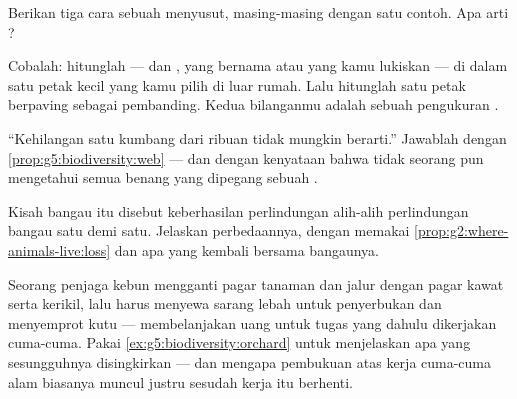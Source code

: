 \begin{exercise}[$\star$]\label{exo:g5:biodiversity:7}
Berikan tiga cara sebuah  menyusut, masing-masing dengan satu
contoh. Apa arti \emph{}?
\end{exercise}

\begin{exercise}[$\star$]\label{exo:g5:biodiversity:8}
Cobalah: hitunglah  ---  dan , yang bernama atau
yang kamu lukiskan --- di dalam satu petak kecil yang kamu pilih di
luar rumah. Lalu hitunglah satu petak berpaving sebagai pembanding.
Kedua bilanganmu adalah sebuah pengukuran .
\end{exercise}

\begin{exercise}[$\star\star$]\label{exo:g5:biodiversity:9}
``Kehilangan satu  kumbang dari ribuan tidak mungkin berarti.''
Jawablah dengan \cref{prop:g5:biodiversity:web} --- dan dengan
kenyataan bahwa tidak seorang pun mengetahui semua benang yang
dipegang sebuah .
\end{exercise}

\begin{exercise}[$\star\star$]\label{exo:g5:biodiversity:10}
Kisah bangau itu disebut keberhasilan perlindungan \emph{}
alih-alih perlindungan bangau satu demi satu. Jelaskan perbedaannya,
dengan memakai \cref{prop:g2:where-animals-live:loss} dan apa yang
kembali bersama bangaunya.
\end{exercise}

\begin{exercise}[$\star\star\star$]\label{exo:g5:biodiversity:11}
Seorang penjaga kebun  mengganti pagar tanaman dan jalur 
dengan pagar kawat serta kerikil, lalu harus menyewa sarang lebah
untuk penyerbukan dan menyemprot kutu  --- membelanjakan uang
untuk tugas yang dahulu dikerjakan cuma-cuma. Pakai
\cref{ex:g5:biodiversity:orchard} untuk menjelaskan apa yang
sesungguhnya disingkirkan --- dan mengapa pembukuan atas kerja
cuma-cuma alam biasanya muncul justru sesudah kerja itu berhenti.
\end{exercise}
